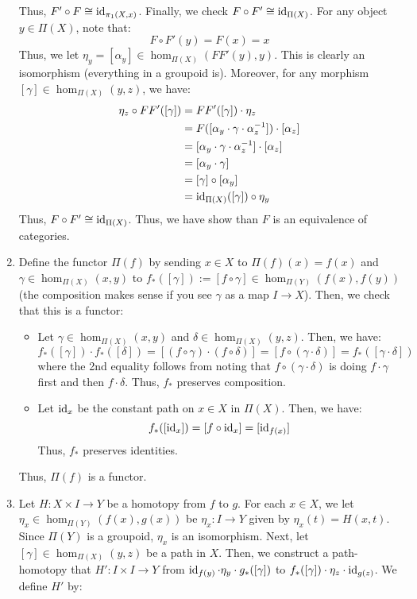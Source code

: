 \documentclass[12pt]{article}
\begin{document}
\begin{solution}
\begin{enumerate}
    Thus, $F' \circ F \cong \operatorname{id}_{\pi_1(X, x)}$. \bbni
    Finally, we check $F \circ F' \cong \operatorname{id}_{\Pi(X)}$. For any object $y \in \Pi(X)$, note that:
    \[ F\circ F'(y) = F(x) = x \]
    Thus, we let $\eta_y = [\alpha_y] \in \hom_{\Pi(X)}(FF'(y), y)$. This is clearly an isomorphism (everything in a groupoid is). Moreover, for any morphism $[\gamma] \in \hom_{\Pi(X)}(y, z)$, we have:
    \begin{align*}
        \eta_z \circ FF'([\gamma]) &= FF'([\gamma]) \cdot \eta_z \\
        &= F([\alpha_y \cdot \gamma \cdot \alpha_z^{-1}]) \cdot [\alpha_z] \\
        &= [\alpha_y \cdot \gamma \cdot \alpha_z^{-1}] \cdot [\alpha_z] \\
        &= [\alpha_y \cdot \gamma] \\
        &= [\gamma] \circ [\alpha_y] \\
        &= \operatorname{id}_{\Pi(X)}([\gamma]) \circ \eta_y
    \end{align*}
    Thus, $F \circ F' \cong \operatorname{id}_{\Pi(X)}$. Thus, we have show than $F$ is an equivalence of categories.
    \item Define the functor $\Pi(f)$ by sending $x \in X$ to $\Pi(f)(x) = f(x)$ and $\gamma \in \hom_{\Pi(X)}(x,y)$ to $f_*([\gamma]) := [f \circ \gamma] \in \hom_{\Pi(Y)}(f(x), f(y))$ (the composition makes sense if you see $\gamma$ as a map $I \to X$). Then, we check that this is a functor:
    \begin{itemize}
        \item Let $\gamma \in \hom_{\Pi(X)}(x,y)$ and $\delta \in \hom_{\Pi(X)}(y,z)$. Then, we have:
        \[ f_*([\gamma]) \cdot f_*([\delta]) = [(f \circ \gamma) \cdot (f \circ \delta)] = [f \circ (\gamma \cdot \delta)] = f_*([\gamma \cdot \delta])\]
        where the 2nd equality follows from noting that $f \circ (\gamma \cdot \delta)$ is doing $f \cdot \gamma$ first and then $f \cdot \delta$. Thus, $f_*$ preserves composition.
        \item Let $\operatorname{id}_x$ be the constant path on $x \in X$ in $\Pi(X)$. Then, we have:
        \[ f_*([\operatorname{id}_x]) = [f \circ \operatorname{id}_x] = [\operatorname{id}_{f(x)}]\]
        Thus, $f_*$ preserves identities.
    \end{itemize}
    Thus, $\Pi(f)$ is a functor.
    \item Let $H: X \times I \to Y$ be a homotopy from $f$ to $g$. For each $x \in X$, we let $\eta_x \in \hom_{\Pi(Y)}(f(x), g(x))$ be $\eta_x: I \to Y$ given by $\eta_x(t) = H(x, t)$. Since $\Pi(Y)$ is a groupoid, $\eta_x$ is an isomorphism. Next, let $[\gamma] \in \hom_{\Pi(X)}(y,z)$ be a path in $X$. Then, we construct a path-homotopy that $H': I \times I \to Y$ from $\operatorname{id}_{f(y)} \cdot \eta_y \cdot g_*([\gamma])$ to $f_*([\gamma]) \cdot \eta_z \cdot \operatorname{id}_{g(z)}$. We define $H'$ by:

\end{enumerate}
\end{solution}
\end{document}
